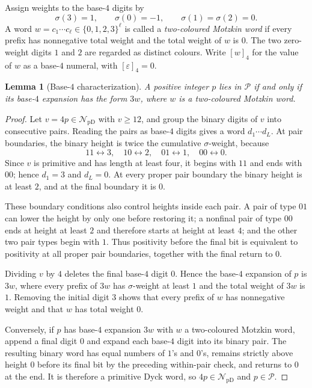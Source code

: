 \documentclass[12pt]{article}
\theoremstyle{plain}
\newtheorem{lemma}[theorem]{Lemma}
\theoremstyle{definition}
\theoremstyle{plain}
\newcommand{\NpD}{\mathcal{N}_{\mathrm{pD}}}
\newcommand{\Pset}{\mathcal{P}}
\begin{document}
Assign weights to the base-$4$ digits by
\[
  \sigma(3)=1,\qquad \sigma(0)=-1,\qquad
  \sigma(1)=\sigma(2)=0.
\]
A word $w=c_1\cdots c_\ell\in\{0,1,2,3\}^{\ell}$ is called a
\emph{two-coloured Motzkin word} if every prefix has nonnegative total weight
and the total weight of $w$ is $0$.  The two zero-weight digits $1$ and $2$ are
regarded as distinct colours.  Write $[w]_4$ for the value of $w$ as a base-$4$
numeral, with $[\varepsilon]_4=0$.

\begin{lemma}[Base-$4$ characterization]\label{lem:base4}
A positive integer $p$ lies in $\Pset$ if and only if its base-$4$ expansion has
the form $3w$, where $w$ is a two-coloured Motzkin word.
\end{lemma}

\begin{proof}
Let $v=4p\in\NpD$ with $v\geq12$, and group the binary digits of $v$ into
consecutive pairs.  Reading the pairs as base-$4$ digits gives a word
$d_1\cdots d_L$.  At pair boundaries, the binary height is twice the cumulative
$\sigma$-weight, because
\[
  11\leftrightarrow3,\quad 10\leftrightarrow2,\quad
  01\leftrightarrow1,\quad 00\leftrightarrow0.
\]
Since $v$ is primitive and has length at least four, it begins with $11$ and
ends with $00$; hence $d_1=3$ and $d_L=0$.  At every proper pair boundary the
binary height is at least $2$, and at the final boundary it is $0$.

These boundary conditions also control heights inside each pair.  A pair of
type $01$ can lower the height by only one before restoring it; a nonfinal pair
of type $00$ ends at height at least $2$ and therefore starts at height at
least $4$; and the other two pair types begin with $1$.  Thus positivity before
the final bit is equivalent to positivity at all proper pair boundaries,
together with the final return to $0$.

Dividing $v$ by $4$ deletes the final base-$4$ digit $0$.  Hence the base-$4$
expansion of $p$ is $3w$, where every prefix of $3w$ has $\sigma$-weight at
least $1$ and the total weight of $3w$ is $1$.  Removing the initial digit $3$
shows that every prefix of $w$ has nonnegative weight and that $w$ has total
weight $0$.

Conversely, if $p$ has base-$4$ expansion $3w$ with $w$ a two-coloured Motzkin
word, append a final digit $0$ and expand each base-$4$ digit into its binary
pair.  The resulting binary word has equal numbers of $1$'s and $0$'s, remains
strictly above height $0$ before its final bit by the preceding within-pair
check, and returns to $0$ at the end.  It is therefore a primitive Dyck word,
so $4p\in\NpD$ and $p\in\Pset$.
\end{proof}
\end{document}
